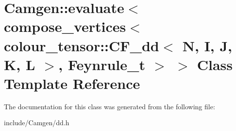 \hypertarget{a00153}{\section{Camgen\-:\-:evaluate$<$ compose\-\_\-vertices$<$ colour\-\_\-tensor\-:\-:C\-F\-\_\-dd$<$ N, I, J, K, L $>$, Feynrule\-\_\-t $>$ $>$ Class Template Reference}
\label{a00153}
}


The documentation for this class was generated from the following file\-:\begin{DoxyCompactItemize}
\item 
include/\-Camgen/dd.\-h\end{DoxyCompactItemize}
